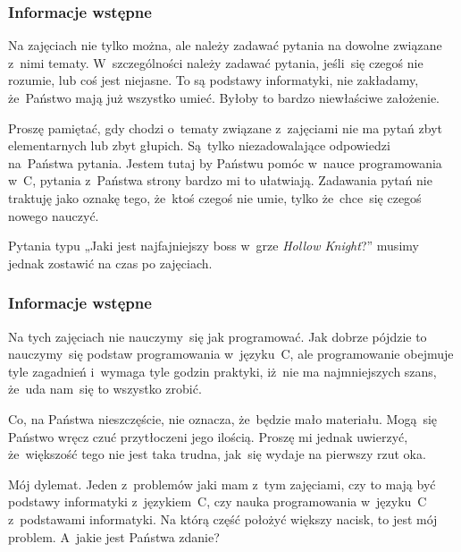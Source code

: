 \documentclass[10pt,t]{beamer}
\begin{document}
\begin{frame}
  \frametitle{Informacje wstępne}


  Na zajęciach nie tylko można, ale \alert{należy} zadawać pytania
  na dowolne związane z~nimi tematy. W~szczególności
  \alert{należy} zadawać pytania, jeśli~się czegoś nie rozumie, lub coś
  jest niejasne. To są podstawy informatyki, \alert{nie} zakładamy,
  że~Państwo mają już wszystko umieć. Byłoby to bardzo niewłaściwe
  założenie.

  Proszę pamiętać, gdy chodzi o~tematy związane z~zajęciami
  \alert{nie} ma pytań zbyt elementarnych lub zbyt głupich. Są~tylko
  niezadowalające odpowiedzi na~Państwa pytania. Jestem tutaj by Państwu
  pomóc w~nauce programowania w~C, pytania z~Państwa strony bardzo mi to
  ułatwiają. Zadawania pytań nie traktuję jako oznakę tego, że~ktoś czegoś
  nie umie, tylko że~chce~się czegoś nowego nauczyć.

  Pytania typu „Jaki jest najfajniejszy boss w~grze \textit{Hollow
    Knight}?” musimy jednak zostawić na czas po zajęciach.

\end{frame}





\begin{frame}
  \frametitle{Informacje wstępne}


  Na tych zajęciach \alert{nie} nauczymy~się jak programować. Jak dobrze
  pójdzie to nauczymy~się podstaw programowania w~języku~C, ale
  programowanie obejmuje tyle zagadnień i~wymaga tyle godzin praktyki,
  iż~nie ma najmniejszych szans, że~uda nam~się to wszystko zrobić.

  Co, na Państwa nieszczęście, nie oznacza, że~będzie mało materiału.
  Mogą~się Państwo wręcz czuć przytłoczeni jego ilością. Proszę mi jednak
  uwierzyć, że~większość tego nie jest taka trudna, jak~się wydaje na
  pierwszy rzut oka.

  \alert{Mój dylemat.} Jeden z~problemów jaki mam z~tym zajęciami, czy to
  mają być \alert{podstawy informatyki} z~językiem~C, czy \alert{nauka
    programowania w~języku~C} z~podstawami informatyki. Na którą część
  położyć większy nacisk, to jest mój problem. A~jakie jest Państwa zdanie?

\end{frame}
\end{document}
